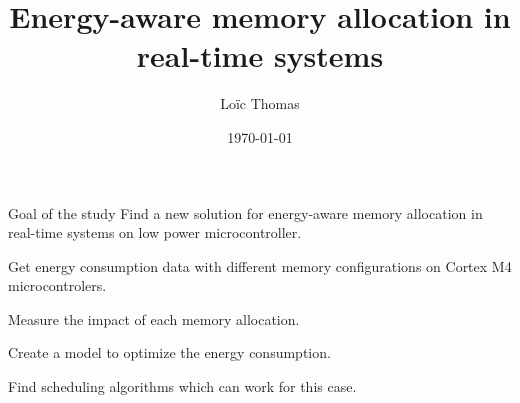 \documentclass[
	11pt, %
]{beamer}
\title[]{Energy-aware memory allocation in real-time systems} %
\subtitle{} %
\author[]{Loïc Thomas} %
\institute[]{LAAS CNRS - VERTICS \\ \smallskip  \textit{l\_thomas@insa-toulouse.fr}} %
\date[\today]{\today} %
\begin{document}

\begin{frame}
	\titlepage %
\end{frame}




\begin{frame}{Goal of the study}
	Find a new solution for energy-aware memory allocation in real-time systems on low power microcontroller.
	\begin{enumerate}
		{\item Get energy consumption data with different memory configurations on Cortex M4 microcontrolers.}
		{\item Measure the impact of each memory allocation.}
		{\item Create a model to optimize the energy consumption.}
		{\item Find scheduling algorithms which can work for this case.}
	\end{enumerate}
\end{frame}
\end{document}
